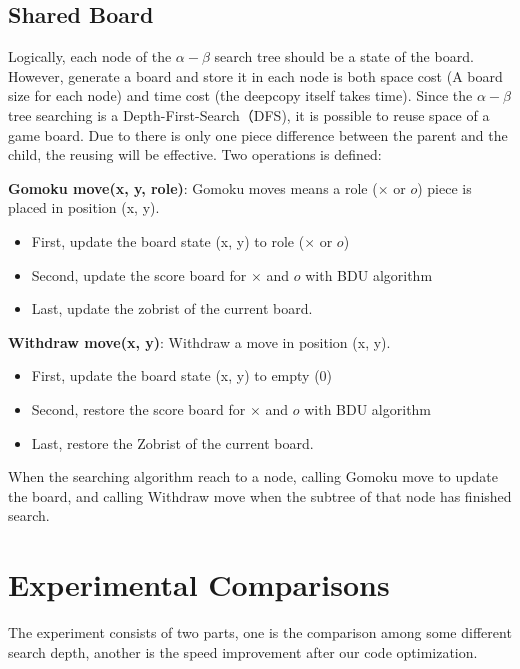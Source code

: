 \documentclass[final]{cvpr}
\begin{document}
\subsection{Shared Board}
Logically, each node of the $\alpha-\beta$ search tree should be a state of the board.
%
However, generate a board and store it in each node is both space cost (A board size for each node) and time cost (the deepcopy itself takes time).
%
Since the $\alpha-\beta$ tree searching is a Depth-First-Search（DFS), it is possible to reuse space of a game board. Due to there is only one piece difference between the parent and the child, the reusing will be effective.
%
Two operations is defined:
%

\textbf{Gomoku move(x, y, role)}:
Gomoku moves means a role ($\times$ or $o$) piece is placed in position (x, y). 
%
\begin{itemize}
\item First, update the board state (x, y) to role ($\times$ or $o$)
\item Second, update the score board for $\times$ and $o$ with BDU algorithm
\item Last, update the zobrist of the current board.
\end{itemize}

\textbf{Withdraw move(x, y)}:
Withdraw a move in position (x, y).
\begin{itemize}
\item First, update the board state (x, y) to empty (0)
\item Second, restore the score board for $\times$ and $o$ with BDU algorithm
\item Last, restore the Zobrist of the current board.
\end{itemize}

When the searching algorithm reach to a node, calling Gomoku move to update the board, 
and calling Withdraw move when the subtree of that node has finished search.



\section{Experimental Comparisons}\label{sec:Experiment}

\par The experiment consists of two parts, one is the comparison among some different search depth, another is the speed improvement after our code optimization.
\end{document}
